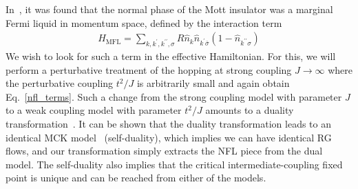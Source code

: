 \documentclass[12pt]{revtex4-2}
\begin{document}
In~\cite{anirbanurg1}, it was found that the normal phase of the Mott insulator was a marginal Fermi liquid in momentum space, defined by the interaction term 
\begin{equation}\begin{aligned}
	\label{mfl_urg}
	H_\text{MFL} = \sum_{k,k^\prime,k^{\prime\prime},\sigma}R \hat n_{k} \hat n_{k^\prime \overline\sigma}\left(1 - \hat n_{k^{\prime\prime}\sigma}\right) 
\end{aligned}\end{equation}
We wish to look for such a term in the effective Hamiltonian. For this, we will perform a perturbative treatment of the hopping at strong coupling \(J \to \infty\) where the perturbative coupling \(t^2/J\) is arbitrarily small and again obtain Eq.~\ref{nfl_terms}. Such a change from the strong coupling model with parameter \(J\) to a weak coupling model with parameter \(t^2/J\) amounts to a duality transformation~\cite{kroha_kolf_2007,zitko_fabrizio_2017}. It can be shown that the duality transformation leads to an identical MCK model~\cite{kroha_kolf_2007} (self-duality), which implies we can have identical RG flows, and our transformation simply extracts the NFL piece from the dual model. The self-duality also implies that the critical intermediate-coupling fixed point is unique and can be reached from either of the models.
\end{document}
